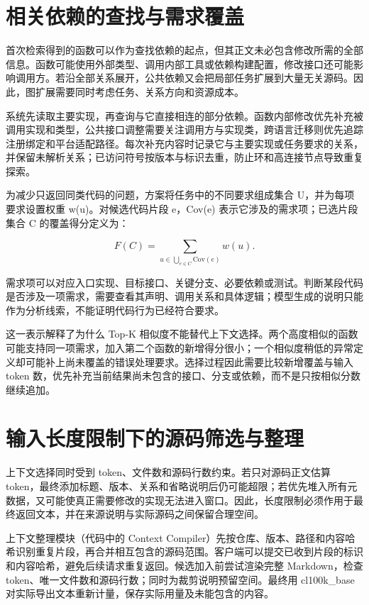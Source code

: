 \section{相关依赖的查找与需求覆盖}

首次检索得到的函数可以作为查找依赖的起点，但其正文未必包含修改所需的全部信息。函数可能使用外部类型、调用内部工具或依赖构建配置，修改接口还可能影响调用方。若沿全部关系展开，公共依赖又会把局部任务扩展到大量无关源码。因此，图扩展需要同时考虑任务、关系方向和资源成本。

系统先读取主要实现，再查询与它直接相连的部分依赖。函数内部修改优先补充被调用实现和类型，公共接口调整需要关注调用方与实现类，跨语言迁移则优先追踪注册绑定和平台适配路径。每次补充内容时记录它与主要实现或任务要求的关系，并保留未解析关系；已访问符号按版本与标识去重，防止环和高连接节点导致重复探索。

为减少只返回同类代码的问题，方案将任务中的不同要求组成集合 U，并为每项要求设置权重 w(u)。对候选代码片段 e，Cov(e) 表示它涉及的需求项；已选片段集合 C 的覆盖得分定义为：

\begin{equation}
F(C)=\sum_{u\in\bigcup_{e\in C}\mathrm{Cov}(e)}w(u).
\end{equation}

需求项可以对应入口实现、目标接口、关键分支、必要依赖或测试。判断某段代码是否涉及一项需求，需要查看其声明、调用关系和具体逻辑；模型生成的说明只能作为分析线索，不能证明代码行为已经符合要求。

这一表示解释了为什么 Top-K 相似度不能替代上下文选择。两个高度相似的函数可能支持同一项需求，加入第二个函数的新增得分很小；一个相似度稍低的异常定义却可能补上尚未覆盖的错误处理要求。选择过程因此需要比较新增覆盖与输入 token 数，优先补充当前结果尚未包含的接口、分支或依赖，而不是只按相似分数继续追加。

\section{输入长度限制下的源码筛选与整理}

上下文选择同时受到 token、文件数和源码行数约束。若只对源码正文估算 token，最终添加标题、版本、关系和省略说明后仍可能超限；若优先堆入所有元数据，又可能使真正需要修改的实现无法进入窗口。因此，长度限制必须作用于最终返回文本，并在来源说明与实际源码之间保留合理空间。

上下文整理模块（代码中的 Context Compiler）先按仓库、版本、路径和内容哈希识别重复片段，再合并相互包含的源码范围。客户端可以提交已收到片段的标识和内容哈希，避免后续请求重复返回。候选加入前尝试渲染完整 Markdown，检查 token、唯一文件数和源码行数；同时为裁剪说明预留空间。最终用 cl100k\_base 对实际导出文本重新计量，保存实际用量及未能包含的内容。

